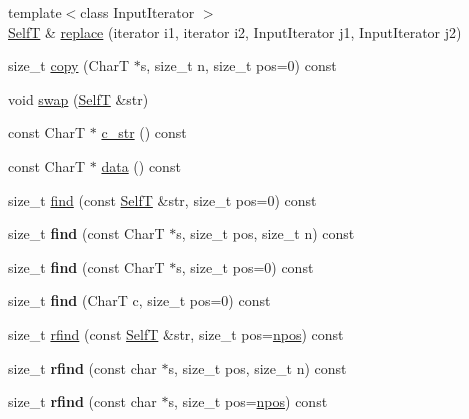 \begin{CompactItemize}
\item 
{\footnotesize template$<$class InputIterator $>$ }\\\hyperlink{classdeque__string}{SelfT} \& \hyperlink{classdeque__string_ff80cea2a38afc2b7200c8bc4358e5c5}{replace} (iterator i1, iterator i2, InputIterator j1, InputIterator j2)
\item 
size\_\-t \hyperlink{classdeque__string_09f252cc4b51eeae6cb8f2f96795123e}{copy} (CharT $\ast$s, size\_\-t n, size\_\-t pos=0) const 
\item 
void \hyperlink{classdeque__string_a1c4ef097e5967b11e1b06b13fb4a9bb}{swap} (\hyperlink{classdeque__string}{SelfT} \&str)
\item 
const CharT $\ast$ \hyperlink{classdeque__string_45faac2747ddd177516bd5d41542cdd9}{c\_\-str} () const 
\item 
const CharT $\ast$ \hyperlink{classdeque__string_43d0a5c5653559cee6bd477fce3f0a2c}{data} () const 
\item 
size\_\-t \hyperlink{classdeque__string_2be9ae2c2547e5d4086aa7aabd1de547}{find} (const \hyperlink{classdeque__string}{SelfT} \&str, size\_\-t pos=0) const 
\item 
\hypertarget{classdeque__string_13708e7fdd0c56feb3a626fdd6a55083}{
size\_\-t \textbf{find} (const CharT $\ast$s, size\_\-t pos, size\_\-t n) const }
\label{classdeque__string_13708e7fdd0c56feb3a626fdd6a55083}

\item 
\hypertarget{classdeque__string_66bbe69c0934423cc575aee5049ff766}{
size\_\-t \textbf{find} (const CharT $\ast$s, size\_\-t pos=0) const }
\label{classdeque__string_66bbe69c0934423cc575aee5049ff766}

\item 
\hypertarget{classdeque__string_b956cd858acbc860c16074c9c991d996}{
size\_\-t \textbf{find} (CharT c, size\_\-t pos=0) const }
\label{classdeque__string_b956cd858acbc860c16074c9c991d996}

\item 
size\_\-t \hyperlink{classdeque__string_c15ec121d4678cfa6cb4dd69b0b8bc16}{rfind} (const \hyperlink{classdeque__string}{SelfT} \&str, size\_\-t pos=\hyperlink{classdeque__string_b2a5692bbdd473486ce93df0cadd2540}{npos}) const 
\item 
\hypertarget{classdeque__string_1ff76cd00bca73f235f2cf00b1c2e25d}{
size\_\-t \textbf{rfind} (const char $\ast$s, size\_\-t pos, size\_\-t n) const }
\label{classdeque__string_1ff76cd00bca73f235f2cf00b1c2e25d}

\item 
\hypertarget{classdeque__string_81fdf7aa8198643c6732f95c921aac67}{
size\_\-t \textbf{rfind} (const char $\ast$s, size\_\-t pos=\hyperlink{classdeque__string_b2a5692bbdd473486ce93df0cadd2540}{npos}) const }
\label{classdeque__string_81fdf7aa8198643c6732f95c921aac67}


\end{CompactItemize}
